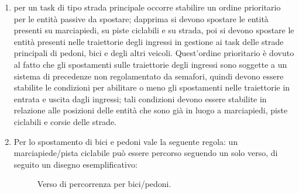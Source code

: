 \begin{enumerate}
\item per un task di tipo strada principale occorre stabilire un ordine prioritario per le entità passive da spostare; dapprima si devono spostare le entità presenti su marciapiedi, su piste ciclabili e su strada, poi si devono spostare le entità presenti nelle traiettorie degli ingressi in gestione ai task delle strade principali di pedoni, bici e degli altri veicoli. 
Quest'ordine prioritario è dovuto al fatto che gli spostamenti sulle traiettorie degli ingressi sono soggette a un sistema di precedenze non regolamentato da semafori, quindi devono essere stabilite le condizioni per abilitare o meno gli spostamenti nelle traiettorie in entrata e uscita dagli ingressi; tali condizioni devono essere stabilite in relazione alle posizioni delle entità che sono già in luogo a marciapiedi, piste ciclabili e corsie delle strade.
\item[]
\begin{description}
Per lo spostamento di bici e pedoni vale la seguente regola: un marciapiede/pista ciclabile può essere percorso seguendo un solo verso,
di seguito un disegno esemplificativo:
\end{description}

\begin{figure}[H] %
\caption{Verso di percorrenza per bici/pedoni.}
\label{fig:Verso di percorrenza per bici/pedoni}
\end{figure}


\end{enumerate}
